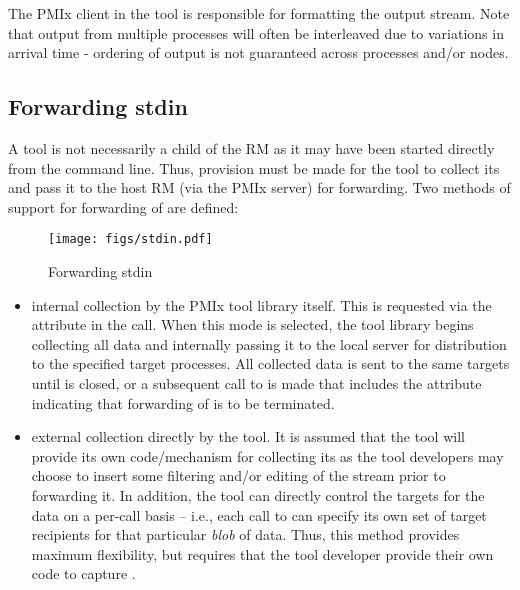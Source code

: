 The \ac{PMIx} client in the tool is responsible for formatting the output stream. Note that output from multiple processes will often be interleaved due to variations in arrival time - ordering of output is not guaranteed across processes and/or nodes.

\subsection{Forwarding stdin}

A tool is not necessarily a child of the \ac{RM} as it may have been started directly from the command line. Thus, provision must be made for the tool to collect its  and pass it to the host \ac{RM} (via the \ac{PMIx} server) for forwarding. Two methods of support for forwarding of  are defined:

\begingroup
\begin{figure*}[ht!]
  \begin{center}
    \texttt{[image: figs/stdin.pdf]}
  \end{center}
  \caption{Forwarding stdin}
  \label{fig:stdin}
\end{figure*}
\endgroup

\begin{itemize}
    \item internal collection by the \ac{PMIx} tool library itself. This is requested via the  attribute in the  call. When this mode is selected, the tool library begins collecting all  data and internally passing it to the local server for distribution to the specified target processes. All collected data is sent to the same targets until  is closed, or a subsequent call to  is made that includes the  attribute indicating that forwarding of  is to be terminated.
    \item external collection directly by the tool. It is assumed that the tool will provide its own code/mechanism for collecting its  as the tool developers may choose to insert some filtering and/or editing of the stream prior to forwarding it. In addition, the tool can directly control the targets for the data on a per-call basis – i.e., each call to  can specify its own set of target recipients for that particular \emph{blob} of data. Thus, this method provides maximum flexibility, but requires that the tool developer provide their own code to capture .
\end{itemize}

